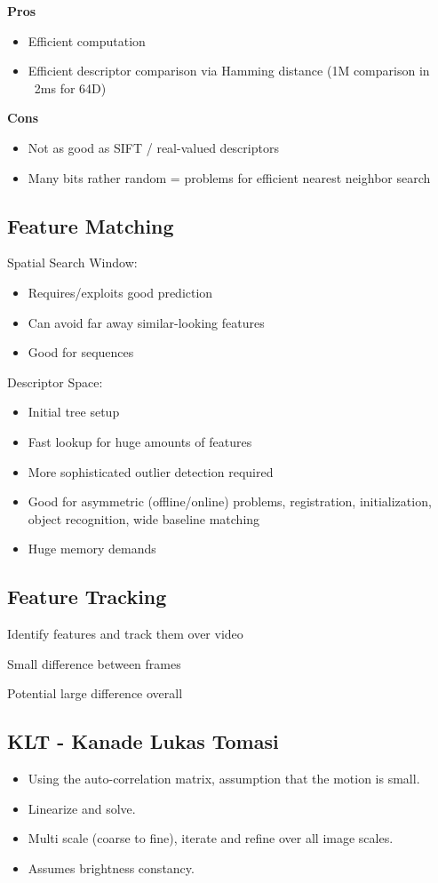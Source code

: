 \textbf{Pros}
\begin{itemize}
\item Efficient computation
\item Efficient descriptor comparison via Hamming distance (1M comparison in ~2ms for 64D)
\end{itemize}

\textbf{Cons}
\begin{itemize}
\item Not as good as SIFT / real-valued descriptors
\item Many bits rather random = problems for efficient nearest neighbor search
\end{itemize}


\subsection{Feature Matching}

Spatial Search Window:
\begin{itemize}
\item Requires/exploits good prediction
\item Can avoid far away similar-looking features
\item Good for sequences
\end{itemize}

Descriptor Space:
\begin{itemize}
\item Initial tree setup
\item Fast lookup for huge amounts of features
\item More sophisticated outlier detection required
\item Good for asymmetric (offline/online) problems, registration, initialization, object recognition, wide baseline matching
\item Huge memory demands
\end{itemize}

\subsection{Feature Tracking}

Identify features and track them over video

Small difference between frames

Potential large difference overall

\subsection{KLT - Kanade Lukas Tomasi}
\begin{itemize}
\item Using the auto-correlation matrix, assumption that the motion is small.
\item Linearize and solve.
\item Multi scale (coarse to fine), iterate and refine over all image scales.
\item Assumes brightness constancy.
\end{itemize}

